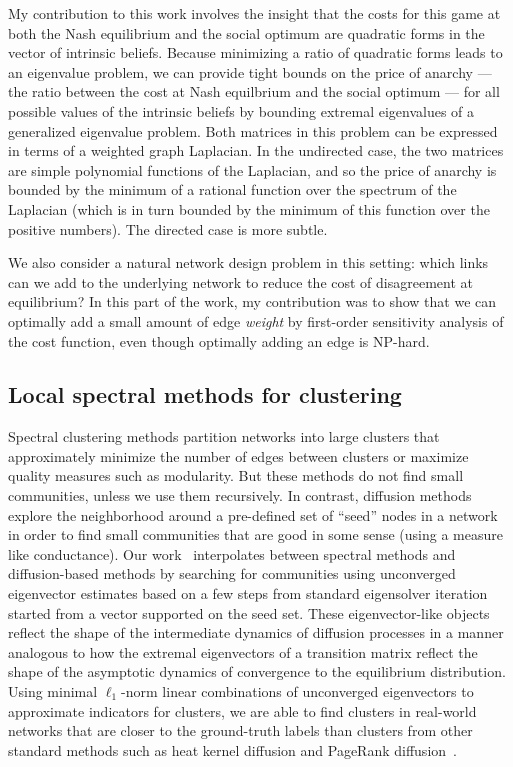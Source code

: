 \documentclass[11pt]{amsart}
\begin{document}
My contribution to this work involves the insight that the costs
for this game at both the Nash equilibrium and the social optimum are
quadratic forms in the vector of intrinsic beliefs.
Because minimizing a ratio of quadratic forms leads to an eigenvalue
problem, we can provide tight bounds on the price of anarchy ---
the ratio between the cost at Nash equilbrium and the social optimum ---
for all possible values of the intrinsic beliefs by bounding extremal
eigenvalues of a generalized eigenvalue problem.
Both matrices in this problem can be expressed in terms of a
weighted graph Laplacian.  In the undirected case, the two matrices are
simple polynomial functions of the Laplacian, and so the price of
anarchy is bounded by the minimum of a rational function over the
spectrum of the Laplacian (which is in turn bounded by the minimum of
this function over the positive numbers).  The directed case is more subtle.

We also consider a natural network design problem in this setting: which
links can we add to the underlying network to reduce the cost of
disagreement at equilibrium? In this part of the work, my contribution
was to show that we can optimally add a small amount of edge {\em weight}
by first-order sensitivity analysis of the cost function, even though
optimally adding an edge is NP-hard.

\subsection*{Local spectral methods for clustering}

Spectral clustering methods partition networks into large
clusters that approximately minimize the number of edges between
clusters or maximize quality measures such as modularity. But these
methods do not find small communities, unless we use them
recursively.
In contrast, diffusion methods explore the neighborhood around a
pre-defined set of ``seed'' nodes in a network in order to find small
communities that are good in some sense (using a measure like
conductance).  Our work~\cite{2016-losp-kdd,2015-icdm,2015-www}
interpolates between spectral methods and diffusion-based
methods by searching for communities using unconverged eigenvector
estimates based on a few steps from standard eigensolver iteration
started from a vector supported on the seed set. These eigenvector-like
objects reflect the shape of the intermediate dynamics of diffusion
processes in a manner analogous to how the extremal eigenvectors of a
transition matrix reflect the shape of the asymptotic dynamics of
convergence to the equilibrium distribution.  Using minimal
$\ell_1$-norm linear combinations of unconverged eigenvectors
to approximate indicators for clusters, we are able to find
clusters in real-world networks that are closer to the ground-truth
labels than clusters from other standard methods such
as heat kernel diffusion and PageRank
diffusion~\cite{Andersen:2006:PR,Kloumann:2014:Community,Kloster:2014:Heat}.
\end{document}
